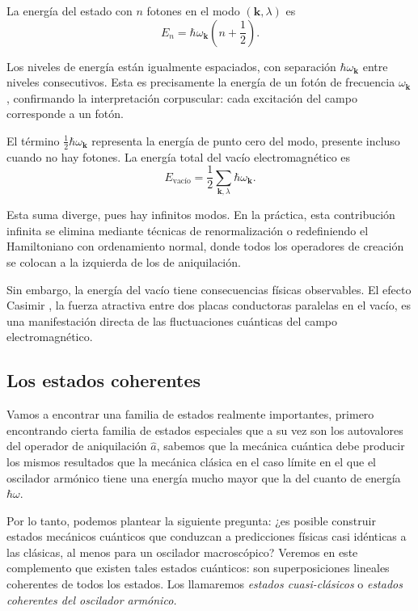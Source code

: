             La energía del estado con $n$ fotones en el modo $(\mathbf{k}, \lambda)$ es
            \begin{equation}
                E_n = \hbar\omega_{\mathbf{k}}\left(n + \frac{1}{2}\right).
            \end{equation}
            
            Los niveles de energía están igualmente espaciados, con separación $\hbar\omega_{\mathbf{k}}$ entre niveles consecutivos. Esta es precisamente la energía de un fotón de frecuencia $\omega_{\mathbf{k}}$, confirmando la interpretación corpuscular: cada excitación del campo corresponde a un fotón.

            El término $\frac{1}{2}\hbar\omega_{\mathbf{k}}$ representa la energía de punto cero del modo, presente incluso cuando no hay fotones. La energía total del vacío electromagnético es
            \begin{equation}
                E_{\text{vacío}} = \frac{1}{2}\sum_{\mathbf{k},\lambda} \hbar\omega_{\mathbf{k}}.
            \end{equation}
            
            Esta suma diverge, pues hay infinitos modos. En la práctica, esta contribución infinita se elimina mediante técnicas de renormalización o redefiniendo el Hamiltoniano con ordenamiento normal, donde todos los operadores de creación se colocan a la izquierda de los de aniquilación.
            
            Sin embargo, la energía del vacío tiene consecuencias físicas observables. El efecto Casimir \cite{Casimir1948}, la fuerza atractiva entre dos placas conductoras paralelas en el vacío, es una manifestación directa de las fluctuaciones cuánticas del campo electromagnético.

        \subsection{Los estados coherentes}

            Vamos a encontrar una familia de estados realmente importantes, primero encontrando cierta familia de estados especiales que a su vez son los autovalores del operador de aniquilación $\hat{a}$, sabemos que la mecánica cuántica debe producir los mismos resultados que la mecánica clásica en el caso límite en el que el oscilador armónico tiene una energía mucho mayor que la del cuanto de energía $\hbar \omega$.

            Por lo tanto, podemos plantear la siguiente pregunta: ¿es posible construir estados mecánicos cuánticos que conduzcan a predicciones físicas casi idénticas a las clásicas, al menos para un oscilador macroscópico? Veremos en este complemento que existen tales estados cuánticos: son superposiciones lineales coherentes de todos los estados. Los llamaremos \textit{estados cuasi-clásicos} o \textit{estados coherentes del oscilador armónico.}

